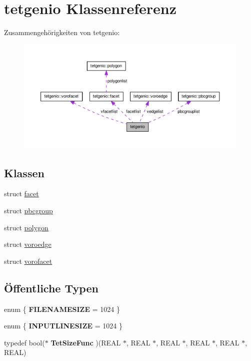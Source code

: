 \hypertarget{classtetgenio}{\section{tetgenio Klassenreferenz}
\label{classtetgenio}
}


Zusammengehörigkeiten von tetgenio\-:\nopagebreak
\begin{figure}[H]
\begin{center}
\leavevmode
\includegraphics[width=350pt]{classtetgenio__coll__graph}
\end{center}
\end{figure}
\subsection*{Klassen}
\begin{DoxyCompactItemize}
\item 
struct \hyperlink{structtetgenio_1_1facet}{facet}
\item 
struct \hyperlink{structtetgenio_1_1pbcgroup}{pbcgroup}
\item 
struct \hyperlink{structtetgenio_1_1polygon}{polygon}
\item 
struct \hyperlink{structtetgenio_1_1voroedge}{voroedge}
\item 
struct \hyperlink{structtetgenio_1_1vorofacet}{vorofacet}
\end{DoxyCompactItemize}
\subsection*{Öffentliche Typen}
\begin{DoxyCompactItemize}
\item 
enum \{ {\bfseries F\-I\-L\-E\-N\-A\-M\-E\-S\-I\-Z\-E} = 1024
 \}
\item 
enum \{ {\bfseries I\-N\-P\-U\-T\-L\-I\-N\-E\-S\-I\-Z\-E} = 1024
 \}
\item 
\hypertarget{classtetgenio_aa1b228427a0bdabc66cead91dd4497b8}{typedef bool($\ast$ {\bfseries Tet\-Size\-Func} )(R\-E\-A\-L $\ast$, R\-E\-A\-L $\ast$, R\-E\-A\-L $\ast$, R\-E\-A\-L $\ast$, R\-E\-A\-L $\ast$, R\-E\-A\-L)}\label{classtetgenio_aa1b228427a0bdabc66cead91dd4497b8}

\end{DoxyCompactItemize}
